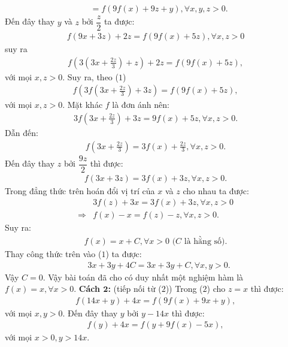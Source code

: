 \begin{multicols}{2}
\begin{align*}
		&= f(9f(x) + 9z + y),\forall x,y,z > 0. \tag{$2$}
	\end{align*}
	Đến đây thay $y$  và $z$  bởi $\dfrac{z}{2}$  ta được: 
	\begin{align*}
		f(9x + 3z) + 2z 
		= f(9f(x) + 5z),\forall x,z > 0
	\end{align*}
	suy ra
	\begin{align*}
		f(3(3x + \frac{{2z}}{3}) + z) + 2z =f(9f(x) + 5z),
	\end{align*}
	với mọi $x,z > 0$.
	Suy ra, theo ($1$)
	\begin{align*}
		f(3f(3x + \frac{{2z}}{3}) + 3z) = f(9f(x) + 5z),
	\end{align*}	
	với mọi $x,z > 0$. Mặt khác $f$  là đơn ánh nên: 
	\begin{align*}
		3f(3x + \frac{{2z}}{3}) + 3z = 9f(x) + 5z,\forall x,z > 0.
	\end{align*}
	Dẫn đến:
	\begin{align*}
		f(3x + \frac{{2z}}{3}) = 3f(x) + \frac{{2z}}{3},\forall x,z > 0.
	\end{align*}
	Đến đây thay $z$  bởi $\dfrac{9z}{2}$  thì được:
	\begin{align*}
		f(3x + 3z) = 3f(x) + 3z,\forall x,z > 0.
	\end{align*}
	Trong đẳng thức trên hoán đổi vị trí của $x$  và $z$ cho nhau ta được: 
	\begin{align*}
		&3f(z) + 3x = 3f(x) + 3z,\forall x,z > 0\\
		\Rightarrow &f(x) - x = f(z) - z,\forall x,z > 0.
	\end{align*}
	Suy ra: 
	\begin{align*}
		f(x) = x + C,\forall x > 0 \text{ ($C$ là hằng số).}
	\end{align*}
	Thay công thức trên vào ($1$) ta được: 
	\begin{align*}
		&3x + 3y + 4C = 3x + 3y + C,\forall x,y > 0.
	\end{align*}
	Vậy $C = 0$. Vậy bài toán đã cho có duy nhất một nghiệm hàm là $f(x) = x, \forall x >0$.
	\vskip 0.1cm
	\textbf{\color{hoccungpi}Cách $\pmb2$:} (tiếp nối từ ($2$))
	\vskip 0.1cm 
	Trong ($2$) cho $z = x$ thì được: 
	\begin{align*}
	f(14x + y) + 4x = f(9f(x) + 9x + y),
	\end{align*}
	với mọi $x,y > 0$. Đến đây thay $y$  bởi $y - 14x$  thì được: 
	\begin{align*}
		f(y) + 4x = f(y + 9f(x) - 5x), 
	\end{align*}
	với mọi $x > 0,y > 14x$.

\end{multicols}
